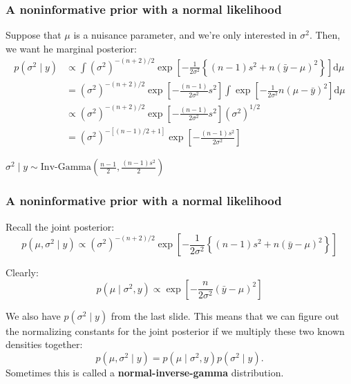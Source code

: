 \documentclass{beamer}
\begin{document}
\begin{frame}
\frametitle{A noninformative prior with a normal likelihood}

Suppose that $\mu$ is a nuisance parameter, and we're only interested in $\sigma^2$. Then, we want he marginal posterior:
\begin{align*}
p(\sigma^2 \mid y) &\propto \int (\sigma^2)^{-(n+2)/2} \exp\left[ - \frac{1}{2\sigma^2}\left\{(n-1)  s^2 + n(\bar{y} - \mu)^2 \right\} \right] \text{d}\mu \\
&= (\sigma^2)^{-(n+2)/2}  \exp\left[ - \frac{(n-1)}{2\sigma^2}s^2  \right] \int \exp\left[ - \frac{1}{2\sigma^2} n(\mu - \bar{y} )^2 \right] \text{d}\mu \\
&\propto (\sigma^2)^{-(n+2)/2}  \exp\left[ - \frac{(n-1)}{2\sigma^2}s^2  \right] (\sigma^2)^{1/2} \\
&= (\sigma^2)^{-[(n-1)/2 + 1]}  \exp\left[ - \frac{(n-1)s^2}{2\sigma^2}  \right] 
\end{align*}

$\sigma^2 \mid y \sim \text{Inv-Gamma}\left(\frac{n-1}{2}, \frac{(n-1)s^2}{2}\right)$
\end{frame}



\begin{frame}
\frametitle{A noninformative prior with a normal likelihood}

Recall the joint posterior:
\[
p(\mu, \sigma^2 \mid y) \propto (\sigma^2)^{-(n+2)/2}\exp\left[ - \frac{1}{2\sigma^2}\left\{(n-1)  s^2 + n(\bar{y} - \mu)^2 \right\} \right]
\]

Clearly:
\[
p(\mu \mid \sigma^2, y) \propto \exp\left[ - \frac{n}{2\sigma^2} (\bar{y} - \mu)^2  \right]
\]
\pause

We also have $p(\sigma^2 \mid y)$ from the last slide. This means that we can figure out the normalizing constants for the joint posterior if we multiply these two known densities together:
\[
p(\mu, \sigma^2 \mid y) = p(\mu \mid \sigma^2,y) p(\sigma^2 \mid y).
\]
Sometimes this is called a {\bf normal-inverse-gamma} distribution.

\end{frame}
\end{document}
